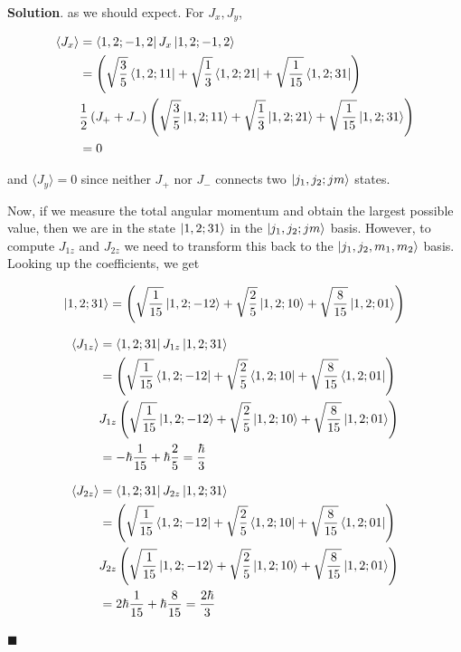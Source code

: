 \documentclass[12pt]{article}
\theoremstyle{definition}
\newenvironment{s}{%
        \begin{trivlist} \item \textbf{Solution}. }{%
            \hspace*{\fill} $\blacksquare$\end{trivlist}}%
\begin{document}
{\begin{s}
as we should expect. For $J_x, J_y$, 

\begin{align*}
\langle J_x \rangle &= \bra{1,2;-1,2} J_x \ket{1,2;-1,2} \\
&= \left(\sqrt{\frac{3}{5}}\bra{1,2;1 1} + \sqrt{\frac{1}{3}}\bra{1,2;2 1} + \sqrt{\frac{1}{15}}\bra{1,2;3 1}\right)\\
&\frac{1}{2}\left(J_+ + J_-\right)\left(\sqrt{\frac{3}{5}}\ket{1,2;1 1} + \sqrt{\frac{1}{3}}\ket{1,2;2 1} + \sqrt{\frac{1}{15}}\ket{1,2;3 1}\right)\\
&= 0
\end{align*}

and $\langle J_{y} \rangle = 0$ since neither $J_+$ nor $J_-$ connects two $\ket{j_1,j_2;jm}$ states.

Now, if we measure the total angular momentum and obtain the largest possible value, then we are in the state $\ket{1,2;31}$ in the $\ket{j_1,j_2;jm}$ basis. However, to compute $J_{1z}$ and $J_{2z}$ we need to transform this back to the $\ket{j_1, j_2, m_1, m_2}$ basis. Looking up the coefficients, we get

\begin{align*}
\ket{1,2;31} = \left(\sqrt{\frac{1}{15}}\ket{1,2;-12} + \sqrt{\frac{2}{5}}\ket{1,2;10} + \sqrt{\frac{8}{15}}\ket{1,2;01}\right)
\end{align*}

\begin{align*}
\langle J_{1z} \rangle &= \bra{1,2;31} J_{1z}  \ket{1,2;31} \\
&= \left(\sqrt{\frac{1}{15}}\bra{1,2;-12} + \sqrt{\frac{2}{5}}\bra{1,2;10} + \sqrt{\frac{8}{15}}\bra{1,2;01}\right)\\
&J_{1z}\left(\sqrt{\frac{1}{15}}\ket{1,2;-12} + \sqrt{\frac{2}{5}}\ket{1,2;10} + \sqrt{\frac{8}{15}}\ket{1,2;01}\right)\\
&= -\hbar\frac{1}{15} + \hbar\frac{2}{5} =  \frac{\hbar}{3}
\end{align*}

\begin{align*}
\langle J_{2z} \rangle &= \bra{1,2;31} J_{2z}  \ket{1,2;31} \\
&= \left(\sqrt{\frac{1}{15}}\bra{1,2;-12} + \sqrt{\frac{2}{5}}\bra{1,2;10} + \sqrt{\frac{8}{15}}\bra{1,2;01}\right)\\
&J_{2z}\left(\sqrt{\frac{1}{15}}\ket{1,2;-12} + \sqrt{\frac{2}{5}}\ket{1,2;10} + \sqrt{\frac{8}{15}}\ket{1,2;01}\right)\\
&= 2\hbar\frac{1}{15} + \hbar\frac{8}{15} = \frac{2\hbar}{3}
\end{align*}


\end{s}}
\end{document}
